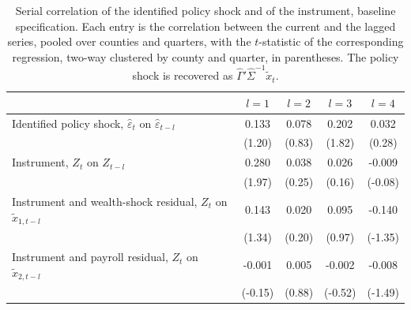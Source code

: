 \begin{table}[ht]\centering\footnotesize
\begin{tabular}{lcccc}\toprule
 & $l=1$ & $l=2$ & $l=3$ & $l=4$\\\midrule
Identified policy shock, $\hat\varepsilon_t$ on $\hat\varepsilon_{t-l}$ & 0.133 & 0.078 & 0.202 & 0.032\\
 & (1.20) & (0.83) & (1.82) & (0.28)\\[2pt]
Instrument, $Z_t$ on $Z_{t-l}$ & 0.280 & 0.038 & 0.026 & -0.009\\
 & (1.97) & (0.25) & (0.16) & (-0.08)\\[2pt]
Instrument and wealth-shock residual, $Z_t$ on $\tilde{x}_{1,t-l}$ & 0.143 & 0.020 & 0.095 & -0.140\\
 & (1.34) & (0.20) & (0.97) & (-1.35)\\[2pt]
Instrument and payroll residual, $Z_t$ on $\tilde{x}_{2,t-l}$ & -0.001 & 0.005 & -0.002 & -0.008\\
 & (-0.15) & (0.88) & (-0.52) & (-1.49)\\[2pt]
\bottomrule\end{tabular}
\caption{Serial correlation of the identified policy shock and of the instrument, baseline specification. Each entry is the correlation between the current and the lagged series, pooled over counties and quarters, with the $t$-statistic of the corresponding regression, two-way clustered by county and quarter, in parentheses. The policy shock is recovered as $\hat\Gamma'\hat\Sigma^{-1}\tilde{x}_t$.\label{tab:cns_shock}}
\end{table}